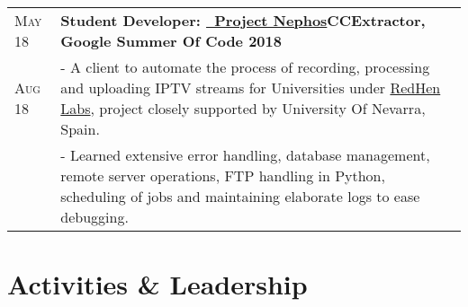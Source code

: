 \documentclass[a4paper,10pt]{extarticle} %
\begin{document}
\begin{tabularx}{\linewidth}{ l | X }

\textsc{May 18} & \textbf{Student Developer: {\href{https://github.com/thealphadollar/Nephos}{\ Project Nephos}}}\hfill\textbf{CCExtractor, Google Summer Of Code 2018}\\
\textsc{Aug 18}& {- A client to automate the process of recording, processing and uploading IPTV streams for Universities under \href{http://www.redhenlab.org/}{RedHen Labs}, project closely supported by University Of Nevarra, Spain.}\\
& {- Learned extensive error handling, database management, remote server operations, FTP handling in Python, scheduling of jobs and maintaining elaborate logs to ease debugging.}\\
\end{tabularx}


\section{\textcolor{primary}{Activities \& Leadership}}
\end{document}

